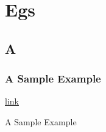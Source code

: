 \setcounter{chapter}{1}
\chapter{Egs}
\section{A}

\subsection{A Sample Example}\hyperref[sec:5]{link}

A Sample Example